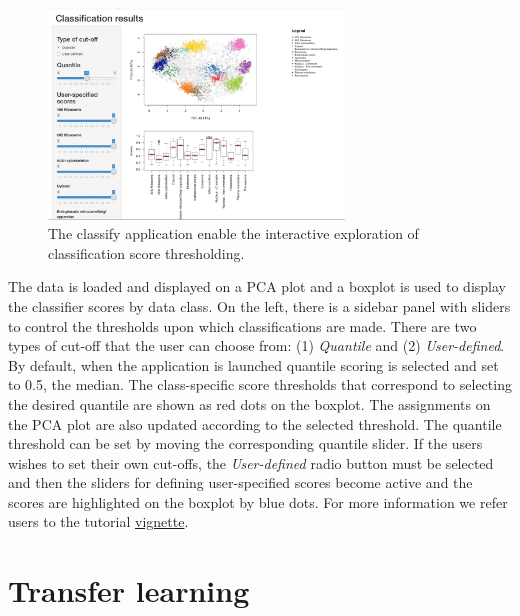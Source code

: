 \begin{figure}[!ht]
  \centering
  \includegraphics[width=0.7\textwidth]{./Figures/classify.png}
  \caption{The classify application enable the interactive exploration
    of classification score thresholding.}
  \label{fig:classifyapp}
\end{figure}

\pagebreak

The data is loaded and displayed on a PCA plot and a boxplot is used
to display the classifier scores by data class. On the left, there is
a sidebar panel with sliders to control the thresholds upon which
classifications are made. There are two types of cut-off that the user
can choose from: (1) \textit{Quantile} and (2)
\textit{User-defined}. By default, when the application is launched
quantile scoring is selected and set to 0.5, the median. The
class-specific score thresholds that correspond to selecting the
desired quantile are shown as red dots on the boxplot. The assignments
on the PCA plot are also updated according to the selected
threshold. The quantile threshold can be set by moving the
corresponding quantile slider. If the users wishes to set their own
cut-offs, the \textit{User-defined} radio button must be selected and
then the sliders for defining user-specified scores become active and
the scores are highlighted on the boxplot by blue dots. For more
information we refer users to the  tutorial
\href{http://bioconductor.org/packages/release/bioc/vignettes/pRolocGUI/inst/doc/pRolocGUI.html}{vignette}.

\clearpage

\section*{Transfer learning}

